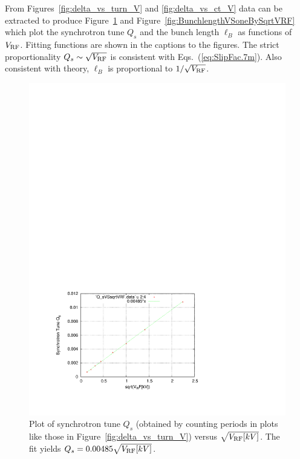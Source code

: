 \documentclass[]{article}
\begin{document}
From Figures~\ref{fig:delta_vs_turn_V} and \ref{fig:delta_vs_ct_V}
data can be extracted to produce Figure~\ref{fig:QsVSsqrtVRF} and 
Figure~\ref{fig:BunchlengthVSoneBySqrtVRF} 
which plot the synchrotron tune $Q_s$ and the bunch length $\ell_B$
as functions of $V_{\rm RF}$.
Fitting functions are shown in the
captions to the figures. The strict proportionality 
$Q_s\sim\sqrt{V_{\rm RF}}$ is consistent with Eqs.~(\ref{eq:SlipFac.7m}).  
Also consistent with theory, $\ell_B$ is proportional 
to $1/\sqrt{V_{\rm RF}}$.
%
\begin{figure}[h]
\centering
\includegraphics[scale=0.7]{pdf/Q_sVSsqrtVRF.pdf}
\caption{\label{fig:QsVSsqrtVRF}Plot of synchrotron tune $Q_s$ 
(obtained by counting periods in plots like those in 
Figure~\ref{fig:delta_vs_turn_V}) versus $\sqrt{V_{\rm RF}[kV]}$.
The fit yields $Q_s=0.00485\sqrt{V_{\rm RF}[kV]}$.
}
\end{figure}
%
%
\end{document}
